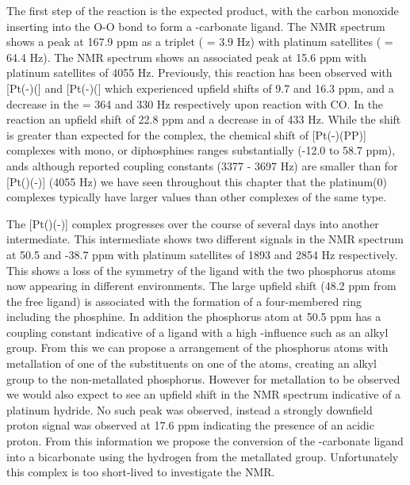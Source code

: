 The first step of the reaction is the expected product, with the carbon monoxide inserting into the O-O bond to form a -carbonate ligand.  The \carbon{} NMR spectrum shows a peak at 167.9 ppm as a triplet (\JPC{} = 3.9 Hz) with platinum satellites (\JPtC{} = 64.4 Hz).  The \phosphorus{} NMR spectrum shows an associated peak at 15.6 ppm with platinum satellites of 4055 Hz.  Previously, this reaction has been observed with [Pt(\hapto{}-)(] and [Pt(\hapto{}-)(] which experienced upfield shifts of 9.7 and 16.3 ppm, and a decrease in the \JPtP{} = 364 and 330 Hz respectively upon reaction with CO.\cite{Goel1983b}  In the \tButhixantphos{} reaction an upfield shift of 22.8 ppm and a decrease in \JPtP{} of 433 Hz.  While the shift is greater than expected for the \tButhixantphos{} complex, the chemical shift of [Pt(-)(PP)] complexes with mono, or diphosphines ranges substantially (-12.0 to 58.7 ppm), ands although reported coupling constants (3377 - 3697 Hz)\cite{Goel1983b} are smaller than for [Pt(\tButhixantphos)(-)] (4055 Hz) we have seen throughout this chapter that the \tBuxantphos{} platinum(0) complexes typically have larger \JPtP{} values than other complexes of the same type.

The [Pt(\tButhixantphos)(-)] complex progresses over the course of several days into another intermediate.  This intermediate shows two different signals in the \phosphorus{} NMR spectrum at 50.5 and -38.7 ppm with platinum satellites of 1893 and 2854 Hz respectively.  This shows a loss of the symmetry of the \tButhixantphos{} ligand with the two phosphorus atoms now appearing in different environments.  The large upfield shift (48.2 ppm from the free ligand) is associated with the formation of a four-membered ring including the phosphine.\cite{Garrou1981}  In addition the phosphorus atom at 50.5 ppm has a coupling constant indicative of a \trans{} ligand with a high \trans{}-influence such as an alkyl group.  From this we can propose a \cis{} arrangement of the phosphorus atoms with metallation of one of the \tBu{} substituents on one of the \phosphorus{} atoms, creating an alkyl group \trans{} to the non-metallated phosphorus.  However for metallation to be observed we would also expect to see an upfield shift in the \proton{} NMR spectrum indicative of a platinum hydride.  No such peak was observed, instead a strongly downfield proton{} signal was observed at 17.6 ppm indicating the presence of an acidic proton.  From this information we propose the conversion of the -carbonate ligand into a bicarbonate using the hydrogen from the metallated \tBu{} group.  Unfortunately this complex is too short-lived to investigate the \carbon{} NMR.  

